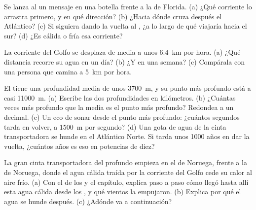 \begin{exercise}[$\star\star$]\label{exo:g8:the-oceans:9}
Se lanza al  un mensaje en una botella frente a la  de Florida.
(a) ¿Qué corriente lo arrastra primero, y en qué dirección? (b) ¿Hacia
dónde cruza después el Atlántico? (c) Si siguiera dando la vuelta al ,
¿a lo largo de qué  viajaría hacia el sur? (d) ¿Es cálida o fría esa
corriente?
\end{exercise}

\begin{exercise}[$\star\star$]\label{exo:g8:the-oceans:10}
La corriente del Golfo se desplaza de media a unos \qty{6.4}{km} por hora.
(a) ¿Qué distancia recorre su agua en un día? (b) ¿Y en una semana?
(c) Compárala con una persona que camina a \qty{5}{km} por hora.
\end{exercise}

\begin{exercise}[$\star\star\star$]\label{exo:g8:the-oceans:11}
El  tiene una profundidad media de unos \qty{3700}{m}, y su punto más
profundo está a casi \qty{11000}{m}. (a) Escribe las dos profundidades en
kilómetros. (b) ¿Cuántas veces más profundo que la media es el punto más
profundo? Redondea a un decimal. (c) Un eco de sonar desde el punto más
profundo: ¿cuántos segundos tarda en volver, a \qty{1500}{m} por segundo?
(d) Una gota de agua de la cinta transportadora se hunde en el Atlántico
Norte. Si tarda unos \num{1000} años en dar la vuelta, ¿cuántos años es
eso en potencias de diez?
\end{exercise}

\begin{exercise}[$\star\star\star$]\label{exo:g8:the-oceans:12}
La gran cinta transportadora del  profundo empieza en el  de
Noruega, frente a la  de Noruega, donde el agua cálida traída por la
corriente del Golfo cede su calor al aire frío. (a) Con el  de los
 y el capítulo, explica paso a paso cómo llegó hasta allí esta agua
cálida desde los , y qué vientos la empujaron. (b) Explica por qué
el agua se hunde después. (c) ¿Adónde va a continuación?
\end{exercise}

